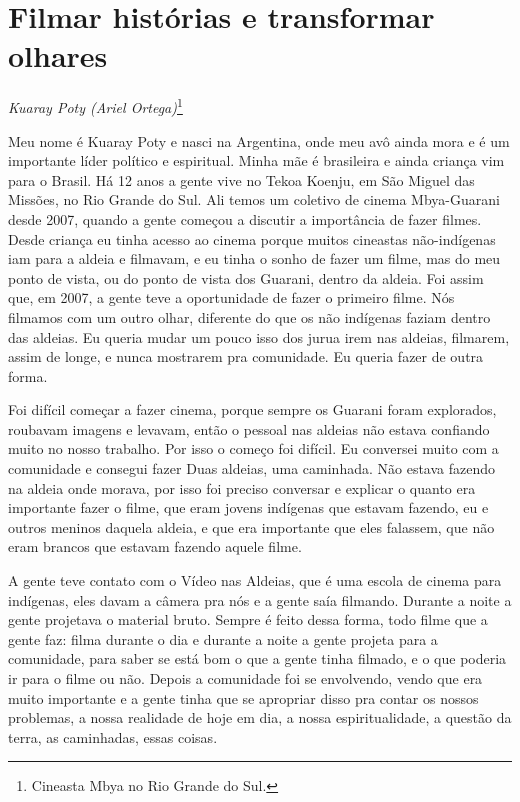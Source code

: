 \chapter{Filmar histórias e transformar olhares}
\begin{flushright}
\emph{Kuaray Poty (Ariel Ortega)}\footnote{Cineasta Mbya no Rio Grande do
Sul.}
\end{flushright}
\medskip

Meu nome é Kuaray Poty e nasci na Argentina, onde meu avô ainda mora e é
um importante líder político e espiritual. Minha mãe é brasileira e
ainda criança vim para o Brasil. Há 12 anos a gente vive no Tekoa
Koenju, em São Miguel das Missões, no Rio Grande do Sul. Ali temos um
coletivo de cinema Mbya-Guarani desde 2007, quando a gente começou a
discutir a importância de fazer filmes. Desde criança eu tinha acesso
ao cinema porque muitos cineastas não-indígenas iam para a aldeia e
filmavam, e eu tinha o sonho de fazer um filme, mas do meu ponto de
vista, ou do ponto de vista dos Guarani, dentro da aldeia. Foi assim
que, em 2007, a gente teve a oportunidade de fazer o primeiro filme.
Nós filmamos com um outro olhar, diferente do que os não indígenas
faziam dentro das aldeias. Eu queria mudar um pouco isso dos jurua irem
nas aldeias, filmarem, assim de longe, e nunca mostrarem pra
comunidade. Eu queria fazer de outra forma. 

Foi difícil começar a fazer cinema, porque sempre os Guarani foram
explorados, roubavam imagens e levavam, então o pessoal nas aldeias não
estava confiando muito no nosso trabalho. Por isso o começo foi
difícil. Eu conversei muito com a comunidade e consegui fazer Duas
aldeias, uma caminhada. Não estava fazendo na aldeia onde morava, por
isso foi preciso conversar e explicar o quanto era importante fazer o
filme, que eram jovens indígenas que estavam fazendo, eu e outros
meninos daquela aldeia, e que era importante que eles falassem, que não
eram brancos que estavam fazendo aquele filme. 

A gente teve contato com o Vídeo nas Aldeias, que é uma escola de cinema
para indígenas, eles davam a câmera pra nós e a gente saía filmando.
Durante a noite a gente projetava o material bruto. Sempre é feito
dessa forma, todo filme que a gente faz: filma durante o dia e durante
a noite a gente projeta para a comunidade, para saber se está bom o que
a gente tinha filmado, e o que poderia ir para o filme ou não. Depois a
comunidade foi se envolvendo, vendo que era muito importante e a gente
tinha que se apropriar disso pra contar os nossos problemas, a nossa
realidade de hoje em dia, a nossa espiritualidade, a questão da terra,
as caminhadas, essas coisas. 

